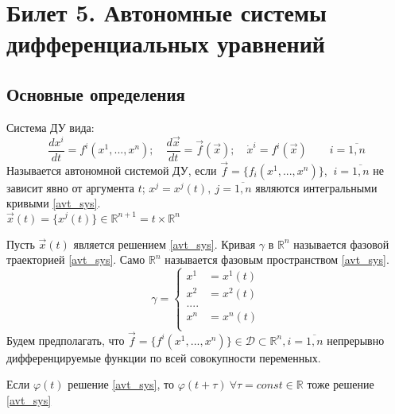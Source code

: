 



	\section{Билет 5. Автономные системы дифференциальных уравнений}
	
		\subsection{Основные определения}
		
		Система ДУ вида: 
		\begin{equation}\label{avt_sys}
			\frac{dx^i}{dt} = f^i(x^1, ..., x^n); \quad \frac{d\vec{x}}{dt} = \vec{f}(\vec{x}); \quad 	\dot{x}^i = f^i(\vec{x}) \quad \quad i = \overline{1, n}
		\end{equation}
		Называется автономной системой ДУ, если $ \vec{f} = \{f_i(x^1, ..., x^n)\} $,  $\ i = \overline{1, n}$ не зависит явно от аргумента $ t $; $ x^j = x^j(t), \ j = \overline{1, n} $ являются интегральными кривыми \eqref{avt_sys}. \\ $\vec{x}(t) = \{ x^j(t) \} \in \mathbb{R}^{n+1} = t \times \mathbb{R}^n$
		\begin{definition}
			Пусть $ \vec{x}(t) $ является решением \eqref{avt_sys}. Кривая $ \gamma $ в $ \mathbb{R}^n $ называется фазовой траекторией \eqref{avt_sys}. Само $ \mathbb{R}^n $ называется фазовым пространством \eqref{avt_sys}.
			\begin{equation}\label{gamma_sys}
				\gamma = \left\{
					\begin{aligned}
						x^1 &= x^1(t) \\
						x^2 &=x^2(t) \\
						.... \\
						x^n &= x^n(t) \\
					\end{aligned}
				\right.
			\end{equation}
			Будем предполагать, что $ \vec{f} = \{ f^i(x^1, ..., x^n) \} \in \mathscr{D} \subset \mathbb{R}^n, i = \overline{1, n} $ непрерывно дифференцируемые функции по всей совокупности переменных.
		\end{definition}
	
		\begin{theorem}
			Если $ \varphi(t) $ решение \eqref{avt_sys}, то $ \varphi(t + \tau) \ \forall \tau = const \in \mathbb{R}$ тоже решение \eqref{avt_sys}
		\end{theorem}
	
